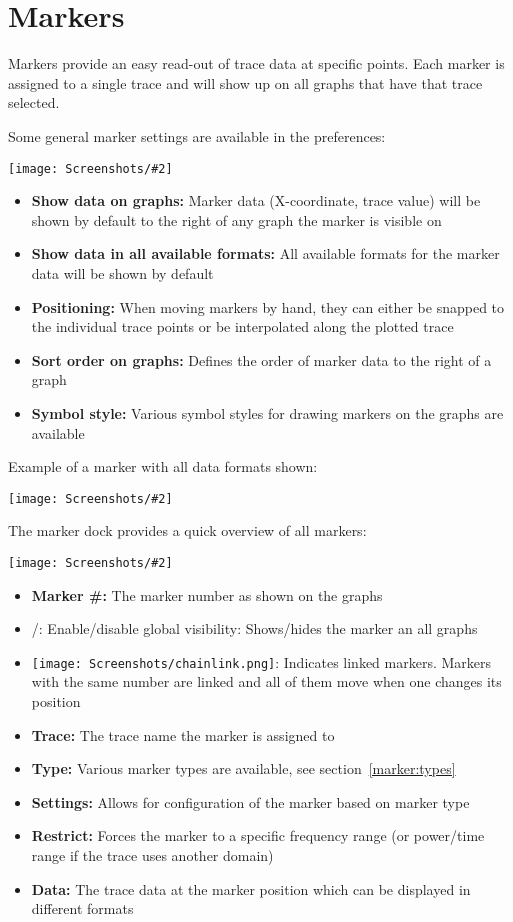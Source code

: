 \documentclass[a4paper,11pt]{article}
\newcommand{\screenshot}[2]{\begin{center}
\texttt{[image: Screenshots/\#2]}
\end{center}}
\begin{document}
\section{Markers}
Markers provide an easy read-out of trace data at specific points. Each marker is assigned to a single trace and will show up on all graphs that have that trace selected.

Some general marker settings are available in the preferences:
\screenshot{1.0}{MarkerPreferences.png}
\begin{itemize}
\item \textbf{Show data on graphs:} Marker data (X-coordinate, trace value) will be shown by default to the right of any graph the marker is visible on
\item \textbf{Show data in all available formats:} All available formats for the marker data will be shown by default
\item \textbf{Positioning:} When moving markers by hand, they can either be snapped to the individual trace points or be interpolated along the plotted trace
\item \textbf{Sort order on graphs:} Defines the order of marker data to the right of a graph
\item \textbf{Symbol style:} Various symbol styles for drawing markers on the graphs are available
\end{itemize}
\vspace{1cm}
Example of a marker with all data formats shown:
\screenshot{0.8}{MarkerExample.png}

The marker dock provides a quick overview of all markers:
\screenshot{1.0}{MarkerDock.png}
\begin{itemize}
\item \textbf{Marker \#:} The marker number as shown on the graphs
\item /: Enable/disable global visibility: Shows/hides the marker an all graphs
\item \texttt{[image: Screenshots/chainlink.png]}: Indicates linked markers. Markers with the same number are linked and all of them move when one changes its position
\item \textbf{Trace:} The trace name the marker is assigned to
\item \textbf{Type:} Various marker types are available, see section~\ref{marker:types}
\item \textbf{Settings:} Allows for configuration of the marker based on marker type
\item \textbf{Restrict:} Forces the marker to a specific frequency range (or power/time range if the trace uses another domain)
\item \textbf{Data:} The trace data at the marker position which can be displayed in different formats
\end{itemize}
\end{document}
